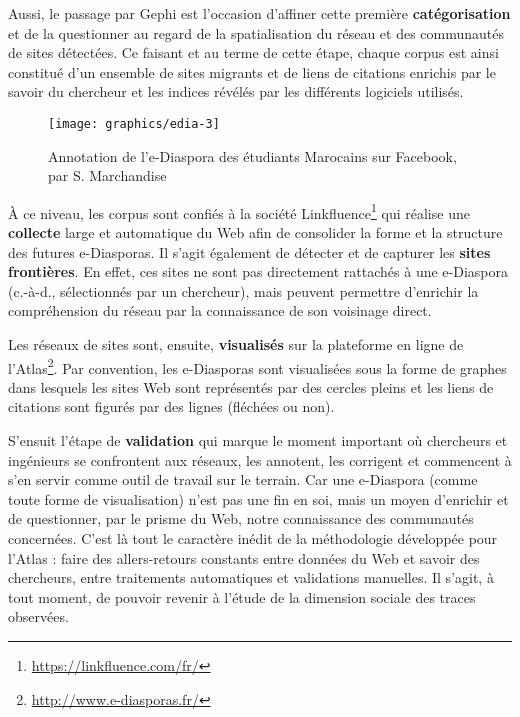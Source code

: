 \documentclass[symmetric,justified,marginals=raggedouter]{tufte-book}
\begin{document}
Aussi, le passage par Gephi est l'occasion d'affiner cette première \textbf{catégorisation} et de la questionner au regard de la spatialisation du réseau et des communautés de sites détectées. Ce faisant et au terme de cette étape, chaque corpus est ainsi constitué d'un ensemble de sites migrants et de liens de citations enrichis par le savoir du chercheur et les indices révélés par les différents logiciels utilisés.  

\begin{figure*}
  \texttt{[image: graphics/edia-3]}
  \caption{Annotation de l'e-Diaspora des étudiants Marocains sur Facebook, par S. Marchandise \citep{marchandise_facebook_2014}}
  \label{fig:edia-3}
\end{figure*}   

\noindent À ce niveau, les corpus sont confiés à la société Linkfluence\footnote{\RaggedOuter \url{https://linkfluence.com/fr/}} qui réalise une \textbf{collecte} large et automatique du Web afin de consolider la forme et la structure des futures e-Diasporas. Il s'agit également de détecter et de capturer les \textbf{sites frontières}. En effet, ces sites ne sont pas directement rattachés à une e-Diaspora (c.-à-d., sélectionnés par un chercheur), mais peuvent permettre d'enrichir la compréhension du réseau par la connaissance de son voisinage direct. 

Les réseaux de sites sont, ensuite, \textbf{visualisés} sur la plateforme en ligne de l'Atlas\footnote{\RaggedOuter \url{http://www.e-diasporas.fr/}}. Par convention, les e-Diasporas sont visualisées sous la forme de graphes dans lesquels les sites Web sont représentés par des cercles pleins et les liens de citations sont figurés par des lignes (fléchées ou non). 

S'ensuit l'étape de \textbf{validation} qui marque le moment important où cher\-cheurs et ingénieurs se confrontent aux réseaux, les annotent, les corrigent et commencent à s'en servir comme outil de travail sur le terrain. Car une e-Diaspora (comme toute forme de visualisation) n'est pas une fin en soi, mais un moyen d'enrichir et de questionner, par le prisme du Web, notre connaissance des communautés concernées. C'est là tout le caractère inédit de la méthodologie développée pour l'Atlas : faire des allers-retours constants entre données du Web et savoir des chercheurs, entre traitements automatiques et validations manuelles. Il s'agit, à tout moment, de pouvoir revenir à l'étude de la dimension sociale des traces observées.   
\end{document}
